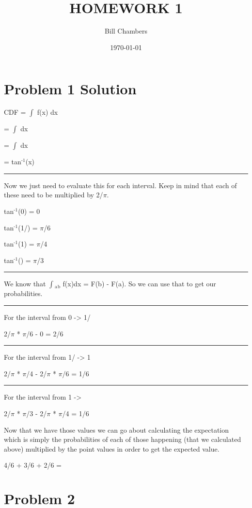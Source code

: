 \documentclass[11pt]{article}
\author{Bill Chambers}
\date{\today}
\title{HOMEWORK 1}
\begin{document}
\maketitle
\tableofcontents



\section{Problem 1 Solution}
\label{sec-1}
CDF = $\int$ f(x) dx

= $\int$ dx

= $\int$ dx

= tan$^{\text{-1}}$(x)

\rule{\linewidth}{0.5pt}

Now we just need to evaluate this for each interval. Keep in mind that each of these need to be multiplied by 2/$\pi$.

tan$^{\text{-1}}$(0) = 0

tan$^{\text{-1}}$(1/) = $\pi$/6

tan$^{\text{-1}}$(1) = $\pi$/4

tan$^{\text{-1}}$() = $\pi$/3

\rule{\linewidth}{0.5pt}

We know that $\int$$_{\text{a}}$$_{\text{b}}$ f(x)dx = F(b) - F(a). So we can use that to get our probabilities.

\rule{\linewidth}{0.5pt}

For the interval from 0 -> 1/

2/$\pi$ * $\pi$/6 - 0 = 2/6


\rule{\linewidth}{0.5pt}

For the interval from 1/ -> 1

2/$\pi$ * $\pi$/4 - 2/$\pi$ * $\pi$/6 = 1/6


\rule{\linewidth}{0.5pt}

For the interval from 1 -> 

2/$\pi$ * $\pi$/3 - 2/$\pi$ * $\pi$/4 = 1/6


Now that we have those values we can go about calculating the expectation which is simply the probabilities of each of those happening (that we calculated above) multiplied by the point values in order to get the expected value.

4/6 + 3/6 + 2/6 = 

\section{Problem 2}
\label{sec-2}
\end{document}
